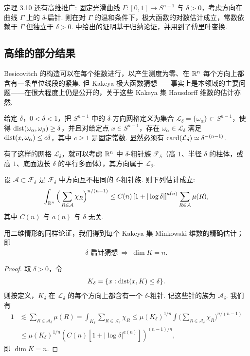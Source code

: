 定理 3.10 还有高维推广: 固定光滑曲线 $\Gamma\colon [0,1] \to S^{n-1}$ 与 $\delta > 0$，考虑方向在曲线 $\Gamma$ 上的 $\delta$-扁针. 则在对 $\Gamma$ 的温和条件下，极大函数的对数估计成立，常数依赖于 $\Gamma$ 但独立于 $\delta > 0$. \cite{b109} 中给出的证明基于归纳论证，并用到了傅里叶变换.

\subsection{高维的部分结果}

Besicovitch 的构造可以在每个维数进行，以产生测度为零、在 $\mathbb{R}^n$ 每个方向上都含有一条单位线段的紧集. 但 Kakeya 极大函数猜想——事实上是本领域的主要问题——在很大程度上仍是公开的，关于这些 Kakeya 集 Hausdorff 维数的估计亦然.

给定 $\delta$，$0 < \delta < 1$，把 $S^{n-1}$ 中的 $\delta$-方向网格定义为集合 $\mathcal{L}_\delta = \{\omega_\alpha\} \subset S^{n-1}$，使得 $\operatorname{dist}(\omega_\alpha, \omega_\beta) \geq \delta$，并且对给定点 $x \in S^{n-1}$，存在 $\omega_\alpha \in \mathcal{L}_\delta$ 满足 $\operatorname{dist}(x, \omega_\alpha) \leq c\delta$，其中 $c \geq 1$ 是固定常数. 显然必须有 $\operatorname{card}(\mathcal{L}_\delta) \simeq \delta^{-(n-1)}$.

有了这样的网格 $\mathcal{L}_{\delta}$，就可以考虑 $\mathbb{R}^{n}$ 中 $\delta$-粗针族 $\mathcal{F}_{\delta}$（高 $1$、半径 $\delta$ 的柱体，或高 $1$、底面边长 $\delta$ 的平行多面体），其方向属于 $\mathcal{L}_{\delta}$.

\begin{conjecture}\label{conj:3.13}
设 $\mathcal{A} \subset \mathcal{F}_\delta$ 是 $\mathcal{F}_\delta$ 中方向互不相同的 $\delta$-粗针族. 则下列估计成立:
\begin{align*}
  \int_{\mathbb{R}^{n}}\Big(\sum_{R\in\mathcal{A}}\chi_{R}\Big)^{n/(n-1)}
  \leq C(n)\left[1+|\log\delta|\right]^{a(n)}\sum_{R\in\mathcal{A}}\mu(R),
\end{align*}
其中 $C(n)$ 与 $a(n)$ 与 $\delta$ 无关.
\end{conjecture}

用二维情形的同样论证，我们得到每个 Kakeya 集 Minkowski 维数的精确估计；即
\begin{align*}
  \delta\text{-扁针猜想}\ \Longrightarrow\ \dim K=n.
\end{align*}

\begin{proof}
取 $\delta > 0$，令
\begin{align*}
  K_{\delta}=\{x:\operatorname{dist}(x,K)\leq\delta\}.
\end{align*}
则按定义，$K_\delta$ 在 $\mathcal{L}_\delta$ 的每个方向上都含有一个 $\delta$-粗针. 记这些针的族为 $\mathcal{A}_\delta$. 我们有
\begin{align*}
  1
  &\lesssim\sum_{R\in\mathcal{A}_{\delta}}\mu(R)
  =\int_{K_{\delta}}\sum_{R\in\mathcal{A}_{\delta}}\chi_{R}
  \leq\mu(K_{\delta})^{1/n}\int\Big(\sum_{R\in\mathcal{A}_{\delta}}\chi_{R}\Big)^{n/(n-1)}\\
  &\leq\mu(K_{\delta})^{1/n}\left(C(n)\left[1+|\log\delta|^{a(n)}\right]\right)^{(n-1)/n},
\end{align*}
即 $\dim K = n$.
\end{proof}

